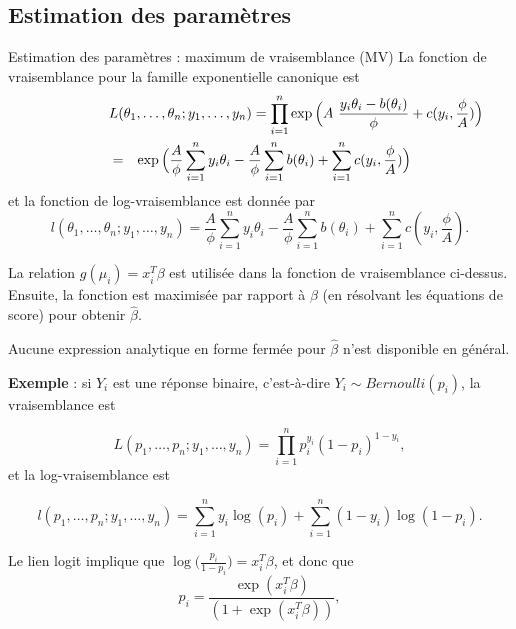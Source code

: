 \documentclass{BeamerTemplate}
\begin{document}
\begin{refsection}
\subsection{Estimation des paramètres}
\label{GLM.estim.section}

\begin{frame}[allowframebreaks]{Estimation des paramètres : maximum de vraisemblance (MV)}
La fonction de vraisemblance pour la {\color{blue}famille exponentielle
canonique} est
\begin{eqnarray*}
  \label{lik.exp}
  \lefteqn{L(\theta_1,\ldots, \theta_n; y_1, \ldots, y_n)= \prod_{i=1}^n \exp \Big( A \ \frac{y_i \theta_i - b(\theta_i)}{\phi} +
c(y_i,\frac{\phi}{A})\Big) }\\
& = & \exp \Big( \frac{A}{\phi} \sum_{i=1}^n y_i \theta_i - \frac{A}{\phi}
\sum_{i=1}^n b(\theta_i) + \sum_{i=1}^n c(y_i,\frac{\phi}{A}) \Big)
\end{eqnarray*}
et la fonction de log-vraisemblance est donnée par
$$l(\theta_1,\ldots, \theta_n; y_1, \ldots, y_n)
 =  \frac{A}{\phi} \sum_{i=1}^n y_i \theta_i - \frac{A}{\phi}
\sum_{i=1}^n b(\theta_i) + \sum_{i=1}^n c(y_i,\frac{\phi}{A}).$$

La relation  $g(\mu_i) = x_i^T \beta$ est utilisée dans la
fonction de vraisemblance ci-dessus. Ensuite, la fonction est maximisée par rapport à
$\beta$ (en résolvant les équations de score) pour obtenir $\hat{\beta}$.

\bigskip

Aucune expression analytique en forme fermée pour $\hat{\beta}$ n'est disponible en général.
\end{frame}

\begin{frame}{}

\textbf{Exemple} : si $Y_i$ est une réponse binaire, c'est-à-dire $Y_i \sim
Bernoulli(p_i)$, la vraisemblance est

\begin{equation*}
  \label{lik.bernoulli}
  L(p_1,\ldots, p_n; y_1, \ldots, y_n) = \prod_{i=1}^n p_i^{y_i} (1-p_i)^{1-y_i},
\end{equation*}
et la log-vraisemblance est

\begin{equation}
  \label{loglik.bernoulli}
l(p_1,\ldots, p_n; y_1, \ldots, y_n) = \sum_{i=1}^n y_i \log (p_i) + \sum_{i=1}^n (1-y_i) \log(1-p_i). 
\end{equation}

\bigskip
Le lien logit implique que $\log \big(\frac{p_i}{1-p_i}\big) = x_i^T
\beta$, et donc que
$$p_i = \frac{\exp(x_i^T \beta)}{(1+\exp(x_i^T \beta))},$$
\end{frame}


\end{refsection}
\end{document}

